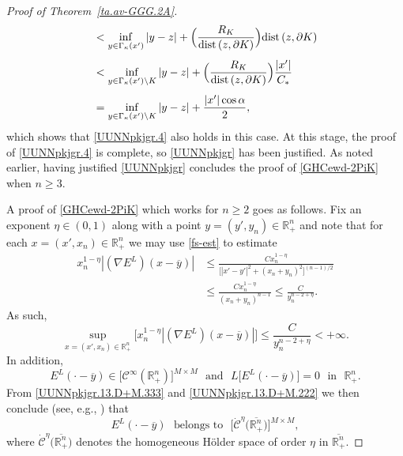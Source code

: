 \documentclass[11pt,reqno]{amsart}
\numberwithin{equation}{section}
\theoremstyle{remark}
\begin{document}
\begin{proof}[Proof of Theorem~\ref{ta.av-GGG.2A}]
\begin{align}
&<\inf_{y\in\Gamma_\kappa(x')}|y-z|+\Big(\frac{R_K}{{\rm dist}\,(z,\partial K)}\Big){\rm dist}\,(z,\partial K)
\nonumber\\[4pt]
&<\inf_{y\in\Gamma_\kappa(x')\setminus K}|y-z|+\Big(\frac{R_K}{{\rm dist}\,(z,\partial K)}\Big)\frac{|x'|}{C_\ast}
\nonumber\\[4pt]
&=\inf_{y\in\Gamma_\kappa(x')\setminus K}|y-z|+\frac{|x'|\cos\alpha}{2},
\end{align}
%
which shows that \eqref{UUNNpkjgr.4} also holds in this case. At this stage, the proof of \eqref{UUNNpkjgr.4} is complete, 
so \eqref{UUNNpkjgr} has been justified. As noted earlier, having justified \eqref{UUNNpkjgr} concludes the proof of 
\eqref{GHCewd-2PiK} when $n\geq 3$.

A proof of \eqref{GHCewd-2PiK} which works for $n\geq 2$ goes as follows. Fix an exponent $\eta\in(0,1)$ along with 
a point $y=(y',y_n)\in{\mathbb{R}}^n_{+}$ and note that for each $x=(x',x_n)\in{\mathbb{R}}^n_{+}$ we may use \eqref{fs-est}
to estimate 
%
\begin{align}\label{UUNNpkjgr.13.D+M}
x_n^{1-\eta}|(\nabla E^L)(x-\overline{y})| & \leq\frac{Cx_n^{1-\eta}}{\big[|x'-y'|^2+(x_n+y_n)^2\big]^{(n-1)/2}}
\nonumber\\[4pt]
&\leq\frac{Cx_n^{1-\eta}}{(x_n+y_n)^{n-1}}\leq\frac{C}{y_n^{n-2+\eta}}.
\end{align}
%
As such, 
%
\begin{equation}\label{UUNNpkjgr.13.D+M.222}
\sup_{x=(x',x_n)\in{\mathbb{R}}^n_{+}}\Big[x_n^{1-\eta}|(\nabla E^L)(x-\overline{y})|\Big]\leq\frac{C}{y_n^{n-2+\eta}}<+\infty.
\end{equation}
%
In addition, 
%
\begin{equation}\label{UUNNpkjgr.13.D+M.333}
E^L(\cdot-\overline{y})\in\big[{\mathscr{C}}^\infty({\mathbb{R}}^n_{+})\big]^{M\times M}\,\,\text{ and }\,\,
L\big[E^L(\cdot-\overline{y})\big]=0\,\,\text{ in }\,\,{\mathbb{R}}^n_{+}.
\end{equation}
%
From \eqref{UUNNpkjgr.13.D+M.333} and \eqref{UUNNpkjgr.13.D+M.222} we then conclude (see, e.g., \cite[(5.11.78), p.\,490]{GHA.I}) that 
%
\begin{equation}\label{UUNNpkjgr.13.D+M.444}
E^L(\cdot-\overline{y})\,\,\text{ belongs to }\,\,\big[\dot{\mathscr{C}}^\eta\big(\overline{{\mathbb{R}}^n_{+}}\big)\big]^{M\times M},
\end{equation}
%
where $\dot{\mathscr{C}}^\eta\big(\overline{{\mathbb{R}}^n_{+}}\big)$ denotes 
the homogeneous H\"older space of order $\eta$ in $\overline{{\mathbb{R}}^n_{+}}$.

\end{proof}
\end{document}
